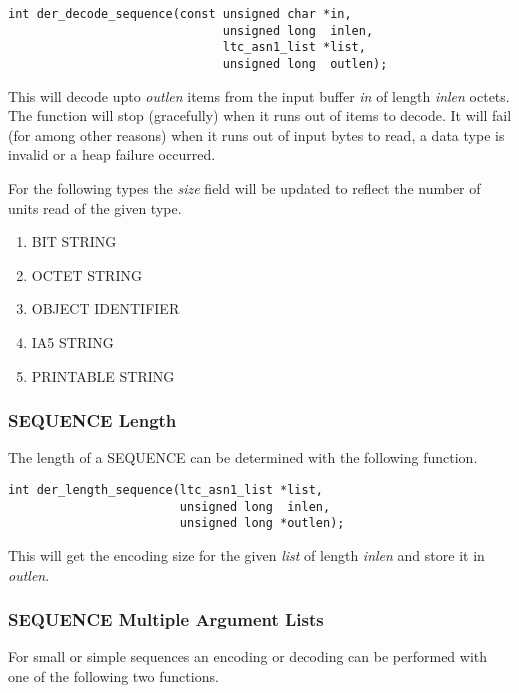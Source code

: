 \documentclass[synpaper]{book}
\begin{document}
\begin{verbatim}
int der_decode_sequence(const unsigned char *in,
                              unsigned long  inlen,
                              ltc_asn1_list *list,
                              unsigned long  outlen);
\end{verbatim}

This will decode upto \textit{outlen} items from the input buffer \textit{in} of length \textit{inlen} octets.  The function will stop (gracefully) when it runs out of items to decode.
It will fail (for among other reasons) when it runs out of input bytes to read, a data type is invalid or a heap failure occurred.

For the following types the \textit{size} field will be updated to reflect the number of units read of the given type.
\begin{enumerate}
   \item BIT STRING
   \item OCTET STRING
   \item OBJECT IDENTIFIER
   \item IA5 STRING
   \item PRINTABLE STRING
\end{enumerate}

\subsubsection{SEQUENCE Length}

The length of a SEQUENCE can be determined with the following function.

\begin{verbatim}
int der_length_sequence(ltc_asn1_list *list,
                        unsigned long  inlen,
                        unsigned long *outlen);
\end{verbatim}

This will get the encoding size for the given \textit{list} of length \textit{inlen} and store it in \textit{outlen}.

\subsubsection{SEQUENCE Multiple Argument Lists}

For small or simple sequences an encoding or decoding can be performed with one of the following two functions.

\end{document}
